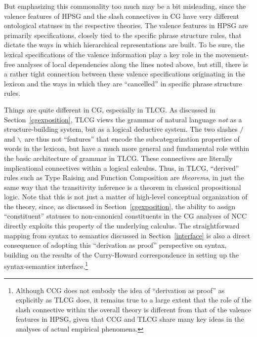 \documentclass[output=paper
                ,modfonts
                ,nonflat
	        ,collection
	        ,collectionchapter
	        ,collectiontoclongg
 	        ,biblatex
                ,babelshorthands
                ,newtxmath
                ,draftmode
                ,colorlinks, citecolor=brown
]{./langsci/langscibook}
\begin{document}
But emphasizing this commonality too much may be a bit misleading,
since the valence features of HPSG and the slash connectives in CG
have very different ontological statuses in the respective theories.
The valence features in HPSG are primarily specifications, closely
tied to the specific phrase structure rules, that dictate the ways in
which hierarchical representations are built. To be sure, the lexical
specifications of the valence information play a key role in the
movement-free analyses of local dependencies along the lines noted
above, but still, there is a rather tight connection between these
valence specifications originating in the lexicon and the ways in
which they are ``cancelled'' in specific phrase structure rules.

Things are quite different in CG, especially in TLCG. As discussed in
Section~\ref{cgexposition}, TLCG views the grammar of natural language \emph{not} as a
structure-building system, but as a logical deductive system. The two
slashes \ensuremath{/} and \ensuremath{\backslash}\ are thus not ``features'' that encode the
subcategorization properties of words in the lexicon, but have a much
more general and fundamental role within the basic architecture of
grammar in TLCG. These connectives are literally 
implicational connectives within a logical calculus. Thus, in TLCG,
``derived'' rules such as
Type Raising and Function Composition are \emph{theorems}, in just the same
way that the 
transitivity inference is a theorem in classical propositional logic.
Note that this is not just a matter of high-level conceptual
organization of the theory, since, as discussed in Section~\ref{cgexposition}, the
ability to assign ``constituent'' statuses to non-canonical constituents
in the CG analyses of NCC directly exploits this property of the
underlying calculus. The straightforward mapping from syntax to
semantics discussed in Section~\ref{interface} is also a direct
consequence of adopting this ``derivation as proof'' perspective on
syntax, building on the results of the Curry-Howard correspondence
\citep{howard1969} in
setting up the syntax-semantics interface.\footnote{Although CCG does
not embody the idea of ``derivation as proof'' as explicitly as TLCG
does, it remains true to a large extent that the role of the slash
connective within the overall theory is different from that of the
valence features in HPSG, given that CCG and TLCG share many key
ideas in the analyses of actual empirical phenomena.}

\end{document}
